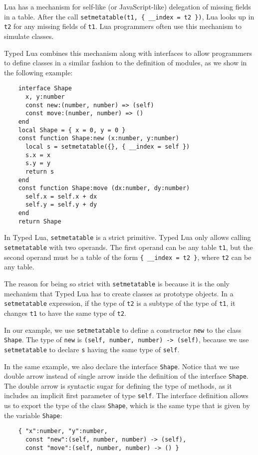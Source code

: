Lua has a mechanism for self-like (or JavaScript-like) delegation of
missing fields in a table.
After the call \texttt{setmetatable(t1, \{ \string_\string_index = t2 \})},
Lua looks up in \texttt{t2} for any missing fields of \texttt{t1}.
Lua programmers often use this mechanism to simulate classes.

Typed Lua combines this mechanism along with interfaces to allow
programmers to define classes in a similar fashion to the definition
of modules, as we show in the following example:
\begin{verbatim}
    interface Shape
      x, y:number
      const new:(number, number) => (self)
      const move:(number, number) => ()
    end
    local Shape = { x = 0, y = 0 }
    const function Shape:new (x:number, y:number)
      local s = setmetatable({}, { __index = self })
      s.x = x
      s.y = y
      return s
    end
    const function Shape:move (dx:number, dy:number)
      self.x = self.x + dx
      self.y = self.y + dy
    end
    return Shape
\end{verbatim}

In Typed Lua, \texttt{setmetatable} is a strict primitive.
Typed Lua only allows calling \texttt{setmetatable} with
two operands.
The first operand can be any table \texttt{t1}, but the second operand
must be a table of the form \texttt{\{ \string_\string_index = t2 \}},
where \texttt{t2} can be any table.

The reason for being so strict with \texttt{setmetatable} is because
it is the only mechanism that Typed Lua has to create classes
as prototype objects.
In a \texttt{setmetatable} expression, if the type of \texttt{t2}
is a subtype of the type of \texttt{t1}, it changes \texttt{t1} to
have the same type of \texttt{t2}.

In our example, we use \texttt{setmetatable} to define a constructor
\texttt{new} to the class \texttt{Shape}.
The type of \texttt{new} is \texttt{(self, number, number) -> (self)},
because we use \texttt{setmetatable} to declare \texttt{s} having
the same type of \texttt{self}.

In the same example, we also declare the interface \texttt{Shape}.
Notice that we use double arrow instead of single arrow inside the
definition of the interface \texttt{Shape}.
The double arrow is syntactic sugar for defining the type of methods,
as it includes an implicit first parameter of type \texttt{self}.
The interface definition allows us to export the type of the class \texttt{Shape},
which is the same type that is given by the variable \texttt{Shape}:
\begin{verbatim}
    { "x":number, "y":number,
      const "new":(self, number, number) -> (self),
      const "move":(self, number, number) -> () }
\end{verbatim}

